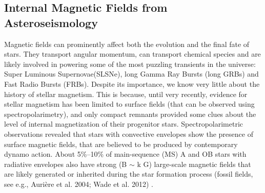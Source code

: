 {\color{red}\subsection{Internal Magnetic Fields from Asteroseismology}}
Magnetic fields can prominently affect both the evolution and the final fate of stars. They transport angular momentum, can transport chemical species
and are likely involved in powering some of the most puzzling transients in the universe: Super Luminous Supernovae(SLSNe), long Gamma Ray Bursts (long GRBs) and Fast Radio Bursts (FRBs). 
Despite its importance, we know very little about the history of stellar magnetism. This is  because, until very recently, 
evidence for stellar magnetism has been limited to surface fields (that can be observed using spectropolarimetry),
and only compact remnants provided some clues about the level of internal magnetization of their progenitor stars.
Spectropolarimetric observations revealed that stars with convective envelopes show the presence of
surface magnetic fields, that are believed to be produced by contemporary dynamo action.
About 5\%–10\% of main-sequence (MS) A and OB stars with radiative envelopes also have strong (B $\sim$ k G)
large-scale magnetic fields that are likely generated or inherited during the star
formation process (fossil fields, see e.g., Aurière et al. 2004; Wade et al. 2012) . 